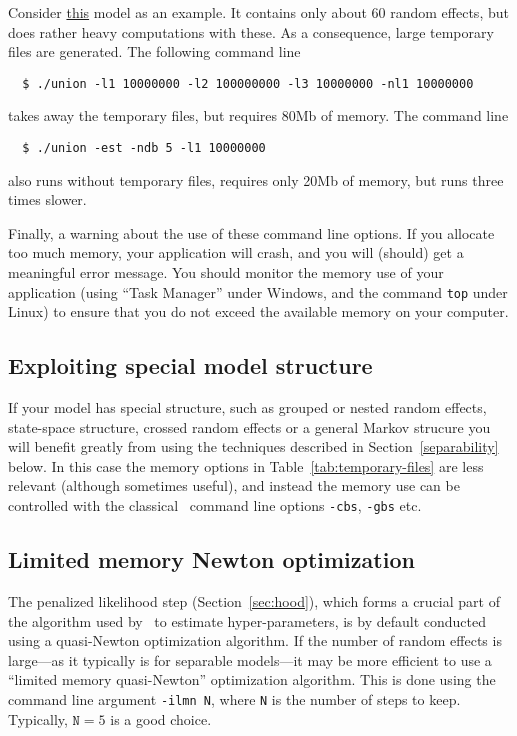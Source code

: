 \documentclass{admbmanual}
\begin{document}
Consider \href{http://otter-rsch.com/admbre/examples/union/union.html}{this}
model as an example. It contains only about 60 random effects, but does rather
heavy computations with these. As a consequence, large temporary files are
generated. The following command line
\begin{lstlisting}
  $ ./union -l1 10000000 -l2 100000000 -l3 10000000 -nl1 10000000
\end{lstlisting}
takes away the temporary files, but requires 80Mb of memory. The command line
\begin{lstlisting}
  $ ./union -est -ndb 5 -l1 10000000
\end{lstlisting}
also runs without temporary files, requires only 20Mb of memory, but runs three
times slower.

Finally, a warning about the use of these command line options. If you allocate
too much memory, your application will crash, and you will (should) get a
meaningful error message. You should monitor the memory use of your application
(using ``Task Manager'' under Windows, and the command \texttt{top} under Linux)
to ensure that you do not exceed the available memory on your computer.

\subsection{Exploiting special model structure}
If your model has special structure, such as
grouped or nested random effects, state-space structure,
crossed random effects or a general Markov strucure
you will benefit greatly from using the techniques
described in Section~\ref{separability} below.
In this case the memory options in Table~\ref{tab:temporary-files}
are less relevant (although sometimes useful), and instead the
memory use can be controlled with the classical \ADM\ command line options
\texttt{-cbs}, \texttt{-gbs} etc.

\subsection{Limited memory Newton optimization}

The penalized likelihood step (Section~\ref{sec:hood}), which forms a crucial
part of the algorithm used by \scAB\ to estimate hyper-parameters, is by default
conducted using a quasi-Newton optimization algorithm. If the number of random
effects is large---as it typically is for separable models---it may be more
efficient to use a ``limited memory quasi-Newton'' optimization algorithm. This
is done using the command line argument \texttt{-ilmn N}, where \texttt{N} is
the number of steps to keep. Typically, $\texttt{N} = 5$ is a good choice.
\end{document}
